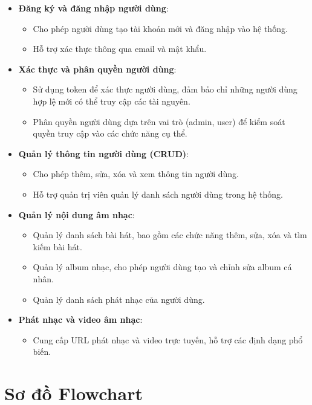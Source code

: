 \begin{itemize}
    \item \textbf{Đăng ký và đăng nhập người dùng}:
    \begin{itemize}
        \item Cho phép người dùng tạo tài khoản mới và đăng nhập vào hệ thống.
        \item Hỗ trợ xác thực thông qua email và mật khẩu.
    \end{itemize}
    \item \textbf{Xác thực và phân quyền người dùng}:
    \begin{itemize}
        \item Sử dụng token để xác thực người dùng, đảm bảo chỉ những người dùng hợp lệ mới có thể truy cập các tài nguyên.
        \item Phân quyền người dùng dựa trên vai trò (admin, user) để kiểm soát quyền truy cập vào các chức năng cụ thể.
    \end{itemize}
    \item \textbf{Quản lý thông tin người dùng (CRUD)}:
    \begin{itemize}
        \item Cho phép thêm, sửa, xóa và xem thông tin người dùng.
        \item Hỗ trợ quản trị viên quản lý danh sách người dùng trong hệ thống.
    \end{itemize}
    \item \textbf{Quản lý nội dung âm nhạc}:
    \begin{itemize}
        \item Quản lý danh sách bài hát, bao gồm các chức năng thêm, sửa, xóa và tìm kiếm bài hát.
        \item Quản lý album nhạc, cho phép người dùng tạo và chỉnh sửa album cá nhân.
        \item Quản lý danh sách phát nhạc của người dùng.
    \end{itemize}
    \item \textbf{Phát nhạc và video âm nhạc}:
    \begin{itemize}
        \item Cung cấp URL phát nhạc và video trực tuyến, hỗ trợ các định dạng phổ biến.
    \end{itemize}
\end{itemize}


\section{Sơ đồ Flowchart}
